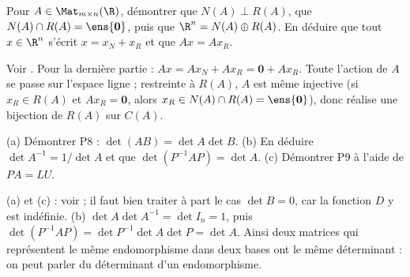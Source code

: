 \begin{exo}
Pour $A\in\Mat_{m\times n}(\R)$, démontrer que $N(A)\perp R(A)$, que $N(A)\cap R(A)=\ens{\mathbf 0}$, puis que $\R^n=N(A)\oplus R(A)$. En déduire que tout $x\in\R^n$ s'écrit $x=x_N+x_R$ et que $Ax=Ax_R$.
\begin{corrige}
Voir . Pour la dernière partie : $Ax=Ax_N+Ax_R=\mathbf 0+Ax_R$. Toute l'action de $A$ se passe sur l'espace ligne ; restreinte à $R(A)$, $A$ est même injective (si $x_R\in R(A)$ et $Ax_R=\mathbf 0$, alors $x_R\in N(A)\cap R(A)=\ens{\mathbf 0}$), donc réalise une bijection de $R(A)$ sur $C(A)$.
\end{corrige}
\end{exo}
\begin{exo}
(a) Démontrer P8 : $\det(AB)=\det A\det B$. (b) En déduire $\det A^{-1}=1/\det A$ et que $\det(P^{-1}AP)=\det A$. (c) Démontrer P9 à l'aide de $PA=LU$.
\begin{corrige}
(a) et (c) : voir  ; il faut bien traiter à part le cas $\det B=0$, car la fonction $D$ y est indéfinie. (b) $\det A\det A^{-1}=\det I_n=1$, puis $\det(P^{-1}AP)=\det P^{-1}\det A\det P=\det A$. Ainsi deux matrices qui représentent le même endomorphisme dans deux bases ont le même déterminant : on peut parler du déterminant d'un endomorphisme.
\end{corrige}
\end{exo}

